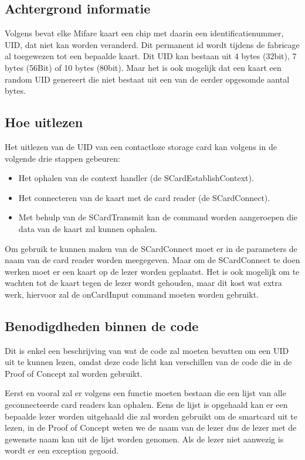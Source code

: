 \subsection{Achtergrond informatie}
Volgens \textcite{SmartcardFocus} bevat elke Mifare kaart een chip met daarin een identificatienummer, UID, dat niet kan worden veranderd. Dit permanent id wordt tijdens de fabricage al toegewezen tot een bepaalde kaart. Dit UID kan bestaan uit 4 bytes (32bit), 7 bytes (56Bit) of 10 bytes (80bit). Maar het is ook mogelijk dat een kaart een random UID genereert die niet bestaat uit een van de eerder opgesomde aantal bytes. 

\subsection{Hoe uitlezen}
Het uitlezen van de UID van een contactloze storage card kan volgens \textcite{SmartcardFocus} in de volgende drie stappen gebeuren:
\begin{itemize}
    \item Het ophalen van de context handler (de SCardEstablishContext). 
    \item Het connecteren van de kaart met de card reader (de SCardConnect). 
    \item Met behulp van de SCardTransmit kan de command worden aangeroepen die data van de kaart zal kunnen ophalen. 
\end{itemize}
Om gebruik te kunnen maken van de SCardConnect moet er in de parameters de naam van de card reader worden meegegeven. Maar om de SCardConnect te doen werken moet er een kaart op de lezer worden geplaatst. Het is ook mogelijk om te wachten tot de kaart tegen de lezer wordt gehouden, maar dit kost wat extra werk, hiervoor zal de onCardInput command moeten worden gebruikt.

\subsection{Benodigdheden binnen de code}
Dit is enkel een beschrijving van wat de code zal moeten bevatten om een UID uit te kunnen lezen, omdat deze code licht kan verschillen van de code die in de Proof of Concept zal worden gebruikt. 

Eerst en vooral zal er volgens \textcite{SmartcardFocus} een functie moeten bestaan die een lijst van alle geconnecteerde card readers kan ophalen. Eens de lijst is opgehaald kan er een bepaalde lezer worden uitgehaald die zal worden gebruikt om de smartcard uit te lezen, in de Proof of Concept weten we de naam van de lezer dus de lezer met de gewenste naam kan uit de lijst worden genomen. Als de lezer niet aanwezig is wordt er een exception gegooid.

